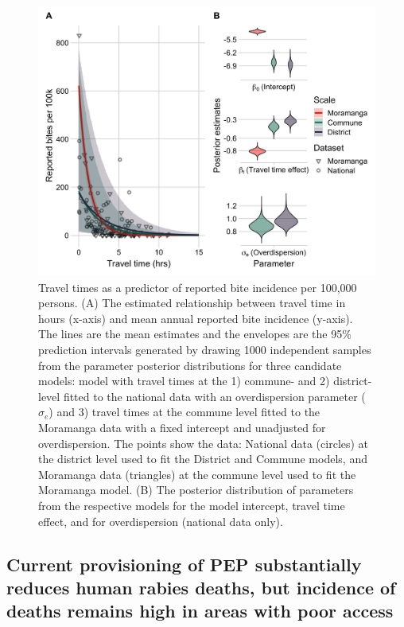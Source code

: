\documentclass[
  oneside]{book}
\begin{document}
\begin{figure}
\includegraphics[width=0.9\linewidth]{figs/ch2/fig4} \caption[Travel times as a predictor of reported bite incidence per 100,000 persons.]{Travel times as a predictor of reported bite incidence per 100,000 persons. (A) The estimated relationship between travel time in hours (x-axis)
and mean annual reported bite incidence (y-axis). The lines are the mean
estimates and the envelopes are the 95\% prediction intervals generated
by drawing 1000 independent samples from the parameter posterior
distributions for three candidate models: model with travel times at the
1) commune- and 2) district-level fitted to the national data with an
overdispersion parameter (\(\sigma_{e}\)) and 3) travel times at the
commune level fitted to the Moramanga data with a fixed intercept and
unadjusted for overdispersion. The points show the data: National data
(circles) at the district level used to fit the District and Commune
models, and Moramanga data (triangles) at the commune level used to fit
the Moramanga model. (B) The posterior distribution of parameters from
the respective models for the model intercept, travel time effect, and
for overdispersion (national data only).}\label{fig:ch3-fig4}
\end{figure}
















\hypertarget{current-provisioning-of-pep-substantially-reduces-human-rabies-deaths-but-incidence-of-deaths-remains-high-in-areas-with-poor-access}{%
\subsection{Current provisioning of PEP substantially reduces human rabies deaths, but incidence of deaths remains high in areas with poor access}\label{current-provisioning-of-pep-substantially-reduces-human-rabies-deaths-but-incidence-of-deaths-remains-high-in-areas-with-poor-access}}
\end{document}

